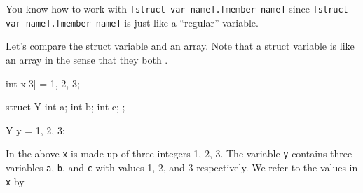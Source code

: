 You  know how to work with \texttt{[struct var name].[member name]} since \texttt{[struct var name].[member name]} is just like a ``regular'' variable.


Let's compare the struct variable and an array. Note that a struct variable is like an array in the sense that they both .

\begin{consolethree}[escapeinside=||]
int x[3] = {1, 2, 3};

struct Y
{
    int a;
    int b;
    int c;
};

Y y = {1, 2, 3};
\end{consolethree}

In the above \texttt{x} is made up of three integers 1, 2, 3. The variable
\texttt{y} contains three variables \texttt{a}, \texttt{b}, and \texttt{c} with
values 1, 2, and 3 respectively. We refer to the values in \texttt{x} by
